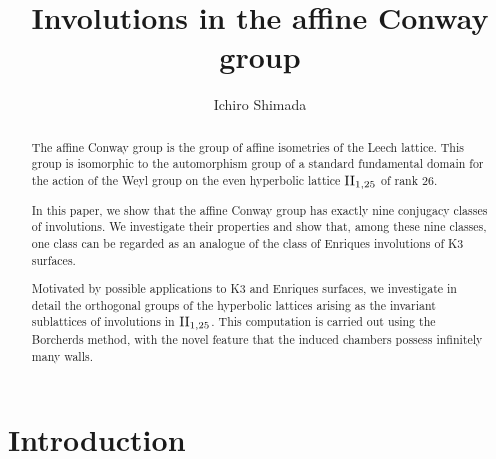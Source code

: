 \documentclass{amsart} %
\begin{document}
%
\title[Involutions in the affine Conway group]
{Involutions in the affine Conway group}
%
\author{Ichiro Shimada}
\address{Department of Mathematics,
Graduate School of Science,
Hiroshima University,
1-3-1 Kagamiyama,
Higashi-Hiroshima,
739-8526 JAPAN}
%
%
\begin{abstract}
The affine Conway group is the group of affine isometries of the Leech lattice.
This group is isomorphic to the automorphism group of 
a standard fundamental domain for the action of 
the Weyl group on the even                                                                                                                                                                                                                                                                                                      hyperbolic lattice $\mathrm{II}_{1, 25}$ of rank $26$.
 \par
In this paper, we show that the affine Conway group has exactly nine conjugacy classes of involutions.
We investigate their properties
and show that, 
among these nine classes, 
one class can be regarded as an analogue of the class of Enriques involutions of K3 surfaces.
 \par
Motivated by possible applications to K3 and Enriques surfaces, 
we investigate in detail the orthogonal groups of the hyperbolic lattices 
arising as the invariant sublattices of involutions in $\mathrm{II}_{1, 25}$.
This computation is carried out using the Borcherds method, 
with the novel feature that the induced chambers possess infinitely many walls.
\end{abstract}
%
\maketitle
%
%
% 
\section{Introduction}
%
\end{document}
